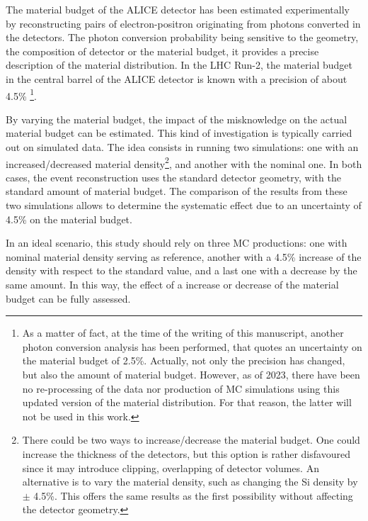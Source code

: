 The material budget of the ALICE detector has been estimated experimentally by reconstructing pairs of electron-positron originating from photons converted in the detectors. The photon conversion probability being sensitive to the geometry, the composition of detector or the material budget, it provides a precise description of the material distribution. In the LHC Run-2, the material budget in the central barrel of the ALICE detector is known with a precision of about 4.5\% \cite{alicecollaborationPerformanceALICEExperiment2014}\cite{alicecollaborationValidationALICEMaterial2022}\footnote{As a matter of fact, at the time of the writing of this manuscript, another photon conversion analysis \cite{alicecollaborationDatadrivenPrecisionDetermination2023} has been performed, that quotes an uncertainty on the material budget of 2.5\%. Actually, not only the precision has changed, but also the amount of material budget. However, as of 2023, there have been no re-processing of the data nor production of MC simulations using this updated version of the material distribution. For that reason, the latter will not be used in this work.}. 


By varying the material budget, the impact of the misknowledge on the actual material budget can be estimated. This kind of investigation is typically carried out on simulated data. The idea consists in running two simulations: one with an increased/decreased material density\footnote{There could be two ways to increase/decrease the material budget. One could increase the thickness of the detectors, but this option is rather disfavoured since it may introduce clipping, overlapping of detector volumes. An alternative is to vary the material density, such as changing the Si density by $\pm$ 4.5\%. This offers the same results as the first possibility without affecting the detector geometry.}, and another with the nominal one. In both cases, the event reconstruction uses the standard detector geometry, \ie with the standard amount of material budget. The comparison of the results from these two simulations allows to determine the systematic effect due to an uncertainty of 4.5\% on the material budget.

In an ideal scenario, this study should rely on three MC productions: one with nominal material density serving as reference, another with a 4.5\% increase of the density with respect to the standard value, and a last one with a decrease by the same amount. In this way, the effect of a increase or decrease of the material budget can be fully assessed. 

